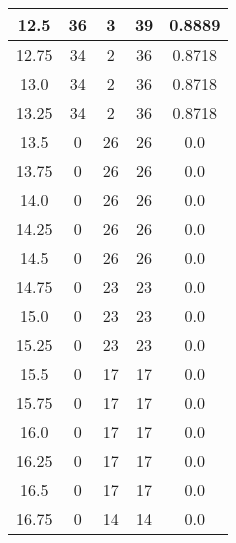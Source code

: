\documentclass[letterpaper, 12pt]{article}
\begin{document}
\begin{longtable}{|c|c|c|c|c|}
12.5 & 36 & 3 & 39 & 0.8889 \\
\hline
12.75 & 34 & 2 & 36 & 0.8718 \\
\hline
13.0 & 34 & 2 & 36 & 0.8718 \\
\hline
13.25 & 34 & 2 & 36 & 0.8718 \\
\hline
13.5 & 0 & 26 & 26 & 0.0 \\
\hline
13.75 & 0 & 26 & 26 & 0.0 \\
\hline
14.0 & 0 & 26 & 26 & 0.0 \\
\hline
14.25 & 0 & 26 & 26 & 0.0 \\
\hline
14.5 & 0 & 26 & 26 & 0.0 \\
\hline
14.75 & 0 & 23 & 23 & 0.0 \\
\hline
15.0 & 0 & 23 & 23 & 0.0 \\
\hline
15.25 & 0 & 23 & 23 & 0.0 \\
\hline
15.5 & 0 & 17 & 17 & 0.0 \\
\hline
15.75 & 0 & 17 & 17 & 0.0 \\
\hline
16.0 & 0 & 17 & 17 & 0.0 \\
\hline
16.25 & 0 & 17 & 17 & 0.0 \\
\hline
16.5 & 0 & 17 & 17 & 0.0 \\
\hline
16.75 & 0 & 14 & 14 & 0.0 \\
\hline
\end{longtable}
\end{document}
